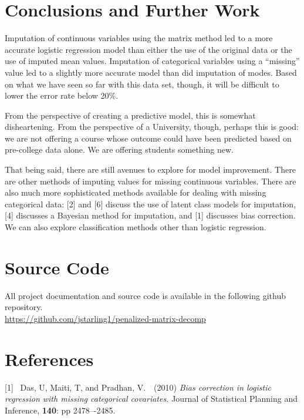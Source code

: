 \documentclass{article}
\newcommand{\myindent}{\hspace*{1cm}}
\begin{document}
\section{Conclusions and Further Work}

Imputation of continuous variables using the matrix method led to a more accurate logistic regression model than either the use of the original data or the use of imputed mean values.  Imputation of categorical variables using a ``missing'' value led to a slightly more accurate model than did imputation of modes.  Based on what we have seen so far with this data set, though, it will be difficult to lower the error rate below 20\%.

From the perspective of creating a predictive model, this is somewhat disheartening.  From the perspective of a University, though, perhaps this is good: we are not offering a course whose outcome could have been predicted based on pre-college data alone.  We are offering students something new.

That being said, there are still avenues to explore for model improvement.  There are other methods of imputing values for missing continuous variables.  There are also much more sophisticated methods available for dealing with missing categorical data: [2] and [6] discuss the use of latent class models for imputation, [4] discusses a Bayesian method for imputation, and [1] discusses bias correction.  We can also explore classification methods other than logistic regression.


\section{Source Code}

All project documentation and source code is available in the following github repository.\\

\myindent \url{https://github.com/jstarling1/penalized-matrix-decomp}\\

\newpage
\section*{References}
\small

[1] \ Das, U, Maiti, T, and Pradhan, V.\ \ (2010) {\it Bias correction in logistic regression with missing categorical covariates.}  Journal of Statistical Planning and Inference, {\bf 140}: pp 2478–-2485.
\end{document}
